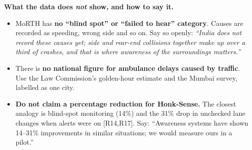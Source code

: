 \documentclass[11pt]{article}
\renewcommand{\cite}[1]{{\color{navy}[#1]}}
\begin{document}
\textbf{What the data does \emph{not} show, and how to say it.}
\begin{itemize}[leftmargin=*]
  \item MoRTH has \textbf{no ``blind spot'' or ``failed to hear'' category}. Causes are recorded as speeding, wrong side and so on. Say so openly: \emph{``India does not record these causes yet; side and rear-end collisions together make up over a third of crashes, and that is where awareness of the surroundings matters.''}
  \item There is \textbf{no national figure for ambulance delays caused by traffic}. Use the Law Commission's golden-hour estimate and the Mumbai survey, labelled as one city.
  \item \textbf{Do not claim a percentage reduction for Honk-Sense.} The closest analogy is blind-spot monitoring (14\%) and the 31\% drop in unchecked lane changes when alerts were on \cite{R14,R17}. Say: ``Awareness systems have shown 14--31\% improvements in similar situations; we would measure ours in a pilot.''
\end{itemize}

\end{document}
